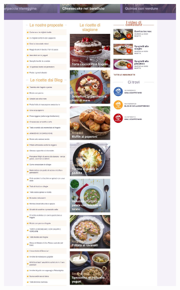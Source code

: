 \begin{figure}[h!]
\begin{subfigure}[b]{0.3\textwidth}
		\includegraphics[scale=0.1]{images/homepage/homepage-2.jpeg}
		\subcaption{}
	\end{subfigure}
	\begin{subfigure}[b]{0.3\textwidth}

\end{subfigure}
\end{figure}

